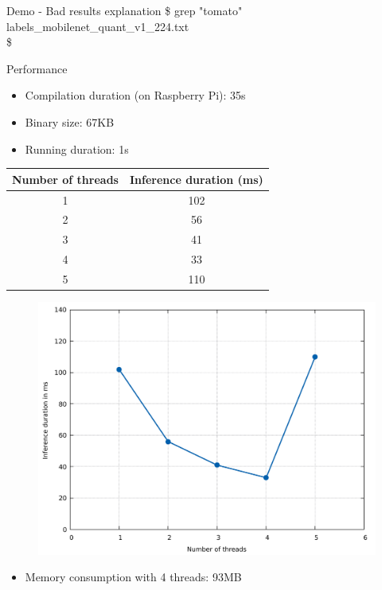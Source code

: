 \begin{frame}{Demo - Bad results explanation}
  \ttfamily \$ grep "tomato" labels\_mobilenet\_quant\_v1\_224.txt \\
  \ttfamily \$
\end{frame}

\begin{frame}{Performance}
  \begin{itemize}
	\item Compilation duration (on Raspberry Pi): 35s
	\item Binary size: 67KB
	\item Running duration: 1s
  \end{itemize}
  \begin{table}
    {\tiny
	\begin{tabular}{|c|c|}
	  \hline
		\textbf{Number of threads} & \textbf{Inference duration (ms)} \\
	  \hline
		1 & 102 \\
	  \hline
		2 & 56 \\
	  \hline
		3 & 41 \\
	  \hline
		4 & 33 \\
	  \hline
		5 & 110 \\
	  \hline
	\end{tabular}
	}
  \end{table}
  \begin{figure}
	\includegraphics[width=\linewidth,height=0.45\textheight,keepaspectratio]{images/inference_duration.pdf}
  \end{figure}
  \begin{itemize}
	\item Memory consumption with 4 threads: 93MB
  \end{itemize}
\end{frame}

